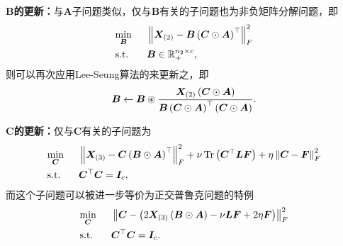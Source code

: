 \textbf{$\boldsymbol{B}$的更新：}与$\boldsymbol{A}$子问题类似，仅与$\boldsymbol{B}$有关的子问题也为非负矩阵分解问题，即
\begin{equation*}
    \begin{aligned}
    &\underset{\mathclap{\boldsymbol{B}}}{\min}\Hquad &&\norm{\boldsymbol{X}_{\left(2\right)}-\boldsymbol{B}\left(\boldsymbol{C}\odot\boldsymbol{A}\right)^{\top}}_{F}^{2}\\
    & \text{s.t.} && \boldsymbol{B}\in \mathbb{R}_{+}^{n_2 \times c},
    \end{aligned}
\end{equation*}
则可以再次应用Lee-Seung算法的来更新之，即
\begin{equation*}
    \boldsymbol{B}\leftarrow\boldsymbol{B}\oast\frac{\boldsymbol{X}_{(2)}\left(\boldsymbol{C}\odot\boldsymbol{A}\right)}{\boldsymbol{B}\left(\boldsymbol{C}\odot\boldsymbol{A}\right)^{\top}\left(\boldsymbol{C}\odot\boldsymbol{A}\right)}.
\end{equation*}

\textbf{$\boldsymbol{C}$的更新：}仅与$\boldsymbol{C}$有关的子问题为
\begin{equation*}
    \begin{aligned}
    &\underset{\boldsymbol{C}}{\min} \hspace{0.5em} &&\left\lVert\boldsymbol{X}_{\left(3\right)}-\boldsymbol{C}\left(\boldsymbol{B}\odot\boldsymbol{A}\right)^{\top}\right\rVert_{F}^{2} + \nu\operatorname{Tr}\left(\boldsymbol{C}^{\top}\boldsymbol{L}\boldsymbol{F}\right) + \eta\left\lVert\boldsymbol{C}-\boldsymbol{F}\right\rVert_{F}^{2}\\
    & \text{s.t.} && \boldsymbol{C}^{\top}\boldsymbol{C}=\boldsymbol{I}_{c},
    \end{aligned}
\end{equation*}
而这个子问题可以被进一步等价为正交普鲁克问题的特例
\begin{equation*}
    \begin{aligned}
    &\underset{\boldsymbol{C}}{\min} \hspace{0.5em} &&\left\lVert\boldsymbol{C} - \left(2\boldsymbol{X}_{(3)}\left(\boldsymbol{B}\odot\boldsymbol{A}\right) - \nu\boldsymbol{L}\boldsymbol{F} + 2\eta\boldsymbol{F}\right)\right\rVert_{F}^{2}\\
    & \text{s.t.} && \boldsymbol{C}^{\top}\boldsymbol{C}=\boldsymbol{I}_{c}.
    \end{aligned}
\end{equation*}

